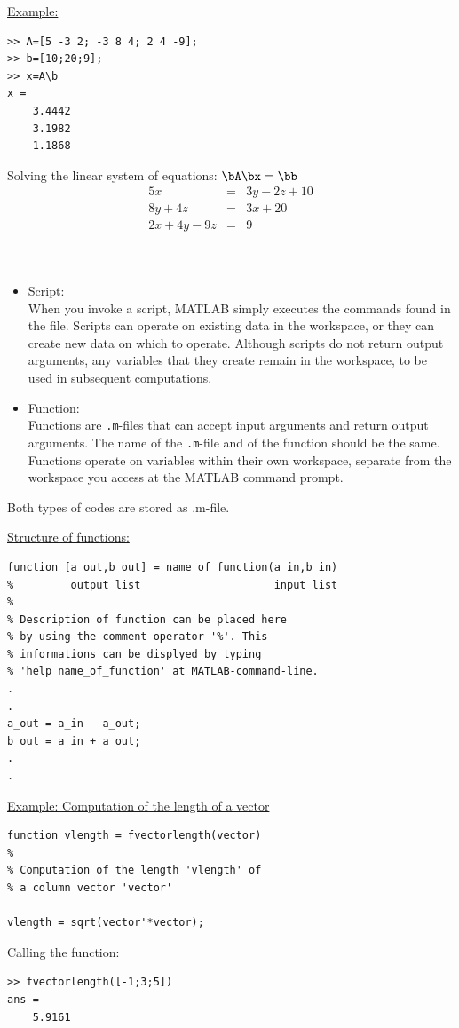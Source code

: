 \medskip
\underline{Example:}\\
\begin{minipage}[t]{0.4\textwidth}
\small\begin{verbatim}
>> A=[5 -3 2; -3 8 4; 2 4 -9];
>> b=[10;20;9];
>> x=A\b
x =
    3.4442
    3.1982
    1.1868
\end{verbatim}
\end{minipage}
\hfill
\begin{minipage}[t]{0.59\textwidth}
Solving the linear system of equations: $\bA\bx = \bb$
\begin{eqnarray*}
5x &=& 3y-2z+10\\
8y+4z &=& 3x+20\\
2x+4y-9z &=& 9\\
\end{eqnarray*}
\end{minipage}

\clearpage
{}
$\phantom{x}$

\begin{itemize}
\item Script:\\
  When you invoke a script, MATLAB simply executes the commands found in the file. Scripts can operate on existing data in the workspace, or they can create new data on which to operate. Although scripts do not return output arguments, any variables that they create remain in the workspace, to be used in subsequent computations. 
\item Function:\\
  Functions are \verb/.m/-files that can accept input arguments and return output arguments. The name of the \verb/.m/-file and of the function should be the same. Functions operate on variables within their own workspace, separate from the workspace you access at the MATLAB command prompt.
\end{itemize}
Both types of codes are stored as .m-file.

\underline{Structure of functions:}
{\small\begin{verbatim}
function [a_out,b_out] = name_of_function(a_in,b_in)
%         output list                     input list
%
% Description of function can be placed here
% by using the comment-operator '%'. This
% informations can be displyed by typing
% 'help name_of_function' at MATLAB-command-line.
.
.
a_out = a_in - a_out;
b_out = a_in + a_out;
.
.
\end{verbatim}}

\underline{Example: Computation of the length of a vector}
{\small\begin{verbatim}
function vlength = fvectorlength(vector)
%
% Computation of the length 'vlength' of
% a column vector 'vector'

vlength = sqrt(vector'*vector);
\end{verbatim}}
Calling the function:
{\small\begin{verbatim}
>> fvectorlength([-1;3;5])
ans =
    5.9161
\end{verbatim}}

